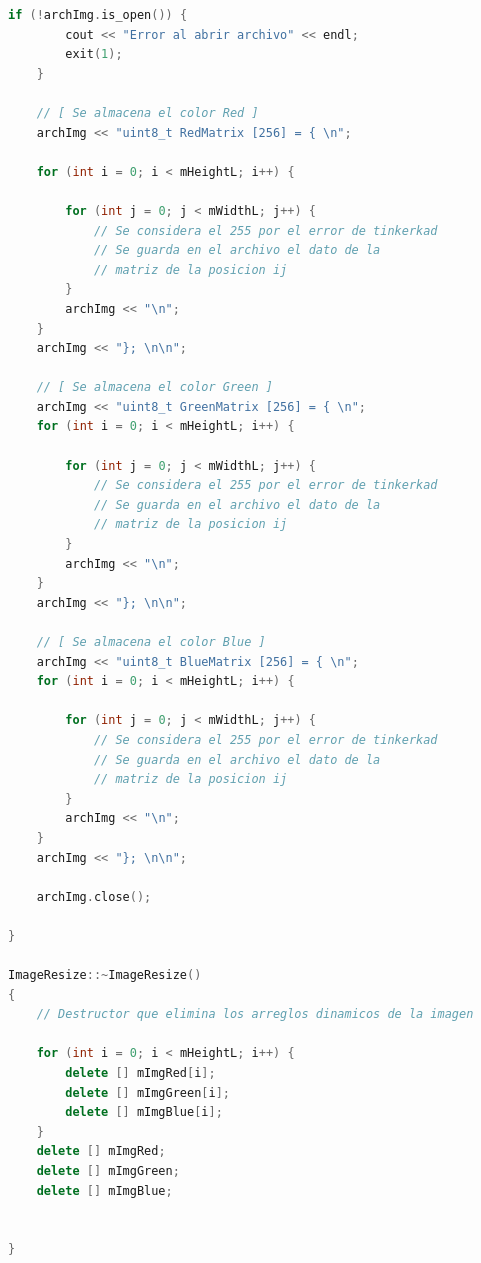 \documentclass{article}
\begin{document}
\begin{lstlisting}[language=C++, label=codigo_matrices_int]
    if (!archImg.is_open()) {
        cout << "Error al abrir archivo" << endl;
        exit(1);
    }

    // [ Se almacena el color Red ]
    archImg << "uint8_t RedMatrix [256] = { \n";
    
    for (int i = 0; i < mHeightL; i++) {

        for (int j = 0; j < mWidthL; j++) {
            // Se considera el 255 por el error de tinkerkad
            // Se guarda en el archivo el dato de la
            // matriz de la posicion ij
        }
        archImg << "\n";
    }
    archImg << "}; \n\n";

    // [ Se almacena el color Green ]
    archImg << "uint8_t GreenMatrix [256] = { \n";
    for (int i = 0; i < mHeightL; i++) {

        for (int j = 0; j < mWidthL; j++) {
            // Se considera el 255 por el error de tinkerkad
            // Se guarda en el archivo el dato de la
            // matriz de la posicion ij
        }
        archImg << "\n";
    }
    archImg << "}; \n\n";

    // [ Se almacena el color Blue ]
    archImg << "uint8_t BlueMatrix [256] = { \n";
    for (int i = 0; i < mHeightL; i++) {

        for (int j = 0; j < mWidthL; j++) {
            // Se considera el 255 por el error de tinkerkad
            // Se guarda en el archivo el dato de la
            // matriz de la posicion ij
        }
        archImg << "\n";
    }
    archImg << "}; \n\n";

    archImg.close();

}

ImageResize::~ImageResize()
{
    // Destructor que elimina los arreglos dinamicos de la imagen

    for (int i = 0; i < mHeightL; i++) {
        delete [] mImgRed[i];
        delete [] mImgGreen[i];
        delete [] mImgBlue[i];
    }
    delete [] mImgRed;
    delete [] mImgGreen;
    delete [] mImgBlue;


}

    
\end{lstlisting}
\end{document}
